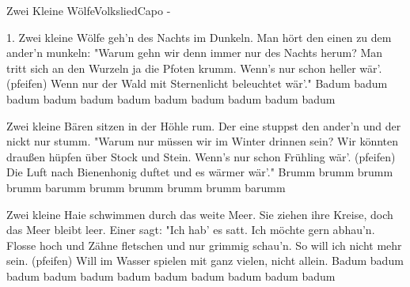 \begin{song}{Zwei Kleine Wölfe}{Volkslied}{Capo -}

1. Zwei kleine Wölfe geh'n des Nachts im Dunkeln.
Man hört den einen zu dem ander'n munkeln:
"Warum gehn wir denn immer nur des Nachts herum?
Man tritt sich an den Wurzeln ja die Pfoten krumm.
Wenn's nur schon heller wär'. (pfeifen)
Wenn nur der Wald mit Sternenlicht beleuchtet wär'."
Badum badum badum badum badum badum
badum badum badum badum badum

Zwei kleine Bären sitzen in der Höhle rum.
Der eine stuppst den ander'n und der nickt nur stumm.
"Warum nur müssen wir im Winter drinnen sein?
Wir könnten draußen hüpfen über Stock und Stein.
Wenn's nur schon Frühling wär'. (pfeifen)
Die Luft nach Bienenhonig duftet und es wärmer wär'."
Brumm brumm brumm brumm barumm
brumm brumm brumm brumm barumm

Zwei kleine Haie schwimmen durch das weite Meer.
Sie ziehen ihre Kreise, doch das Meer bleibt leer.
Einer sagt: "Ich hab' es satt. Ich möchte gern abhau'n.
Flosse hoch und Zähne fletschen und nur grimmig schau'n.
So will ich nicht mehr sein. (pfeifen)
Will im Wasser spielen mit ganz vielen, nicht allein.
Badum badum badum badum badum badum
badum badum badum badum badum


\end{song}
